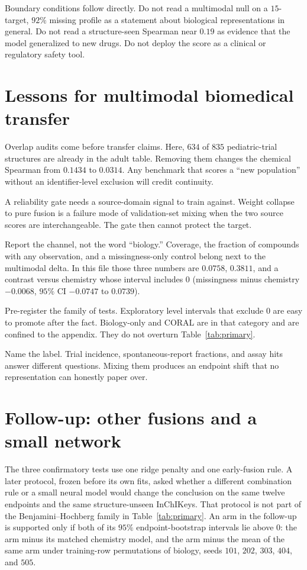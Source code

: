 \documentclass[10pt]{article}
\begin{document}
Boundary conditions follow directly.
Do not read a multimodal null on a $15$-target, $92\%$ missing profile as a statement about biological representations in general.
Do not read a structure-seen Spearman near $0.19$ as evidence that the model generalized to new drugs.
Do not deploy the score as a clinical or regulatory safety tool.

\section{Lessons for multimodal biomedical transfer}
\label{sec:lessons}

Overlap audits come before transfer claims.
Here, $634$ of $835$ pediatric-trial structures are already in the adult table.
Removing them changes the chemical Spearman from $0.1434$ to $0.0314$.
Any benchmark that scores a ``new population'' without an identifier-level exclusion will credit continuity.

A reliability gate needs a source-domain signal to train against.
Weight collapse to pure fusion is a failure mode of validation-set mixing when the two source scores are interchangeable.
The gate then cannot protect the target.

Report the channel, not the word ``biology.''
Coverage, the fraction of compounds with any observation, and a missingness-only control belong next to the multimodal delta.
In this file those three numbers are $0.0758$, $0.3811$, and a contrast versus chemistry whose interval includes $0$ (missingness minus chemistry $-0.0068$, $95\%$ CI $-0.0747$ to $0.0739$).

Pre-register the family of tests.
Exploratory level intervals that exclude $0$ are easy to promote after the fact.
Biology-only and CORAL are in that category and are confined to the appendix.
They do not overturn Table~\ref{tab:primary}.

Name the label.
Trial incidence, spontaneous-report fractions, and assay hits answer different questions.
Mixing them produces an endpoint shift that no representation can honestly paper over.

\section{Follow-up: other fusions and a small network}
\label{sec:v5}

The three confirmatory tests use one ridge penalty and one early-fusion rule.
A later protocol, frozen before its own fits, asked whether a different combination rule or a small neural model would change the conclusion on the same twelve endpoints and the same structure-unseen InChIKeys.
That protocol is not part of the Benjamini--Hochberg family in Table~\ref{tab:primary}.
An arm in the follow-up is supported only if both of its $95\%$ endpoint-bootstrap intervals lie above $0$: the arm minus its matched chemistry model, and the arm minus the mean of the same arm under training-row permutations of biology, seeds $101$, $202$, $303$, $404$, and $505$.
\end{document}
